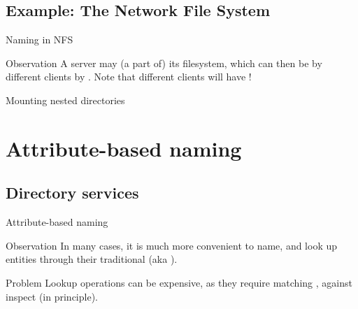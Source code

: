 \subsection{Example: The Network File System}
\begin{slide}{Naming in NFS}
  \begin{centerfig}
  \end{centerfig}
  \begin{block}{Observation}
    A server may  (a part of) its filesystem, which can then be  by different
    clients by . Note that different clients will have !
  \end{block}
\end{slide}
\begin{slide}{Mounting nested directories}
  \begin{centerfig}
  \end{centerfig}
\end{slide}
\section{Attribute-based naming}
\subsection{Directory services}
\begin{slide}{Attribute-based naming}
  \begin{block}{Observation} 
    In many cases, it is much more convenient to name, and look up entities through their
     \mathexpr{\Rightarrow} traditional  (aka ).
  \end{block}
  \onslide
  \begin{alertblock}{Problem} 
    Lookup operations can be expensive, as they require matching ,
    against  \mathexpr{\Rightarrow} inspect  (in principle).
  \end{alertblock}
\end{slide}
